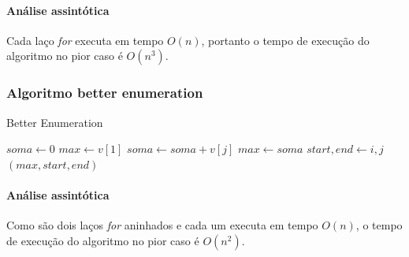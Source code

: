 \documentclass[
	12pt,				%
	oneside,   	        %
	a4paper,			%
	english,			%
	french,				%
	spanish,			%
	brazil,				%
	]{pacotes/abntex2}
\begin{document}
\paragraph{Análise assintótica} Cada laço \textit{for} executa em tempo $O(n)$, portanto o tempo de execução do algoritmo no pior caso é $O(n^3)$.

\subsubsection{Algoritmo better enumeration}
\begin{algorithm}
\caption{Better Enumeration}
\label{algo:preencheprimeiroarranjo}
\begin{algorithmic}[1]
        \State  $soma \gets 0$
        \State $max \gets v[1]$
                \State $soma \gets soma+v[j]$
                    \State $max \gets soma$
                    \State $start, end \gets i, j$
                \EndIf
            \EndFor
        \EndFor
        \State \Return $(max, start, end)$
    \EndFunction
\end{algorithmic}
\end{algorithm}

\paragraph{Análise assintótica} Como são dois laços \textit{for} aninhados e cada um executa em tempo $O(n)$, o tempo de execução do algoritmo no pior caso é $O(n^2)$.
\end{document}
